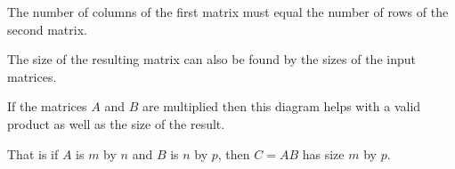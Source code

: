 \begin{Boxed*}
The number of columns of the first matrix must equal the number of rows of the second matrix.
\end{Boxed*}

The size of the resulting matrix can also be found by the sizes of the input matrices.  

\begin{Boxed*}
If the matrices $A$ and $B$ are multiplied then this diagram helps with a valid product as well as the size of the result. 

\begin{center}
\end{center}

That is if $A$ is $m$ by $n$ and $B$ is $n$ by $p$, then $C=AB$ has size $m$ by $p$. 

\end{Boxed*}

